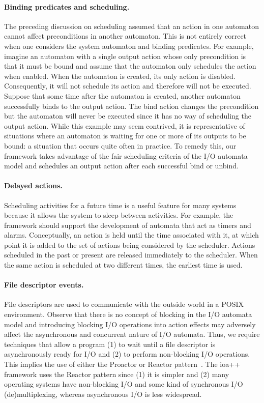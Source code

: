 \paragraph*{Binding predicates and scheduling.}
The preceding discussion on scheduling assumed that an action in one automaton cannot affect preconditions in another automaton.
This is not entirely correct when one considers the system automaton and binding predicates.
For example, imagine an automaton with a single output action whose only precondition is that it must be bound and assume that the automaton only schedules the action when enabled.
When the automaton is created, its only action is disabled.
Consequently, it will not schedule its action and therefore will not be executed.
Suppose that some time after the automaton is created, another automaton successfully binds to the output action.
The bind action changes the precondition but the automaton will never be executed since it has no way of scheduling the output action.
While this example may seem contrived, it is representative of situations where an automaton is waiting for one or more of its outputs to be bound: a situation that occurs quite often in practice.
To remedy this, our framework takes advantage of the fair scheduling criteria of the I/O automata model and schedules an output action after each successful bind or unbind.

\paragraph*{Delayed actions.}
Scheduling activities for a future time is a useful feature for many systems because it allows the system to sleep between activities. For example, the framework should support the development of automata that act as timers and alarms.
Conceptually, an action is held until the time associated with it, at which point it is added to the set of actions being considered by the scheduler.
Actions scheduled in the past or present are released immediately to the scheduler.
When the same action is scheduled at two different times, the earliest time is used.

\paragraph*{File descriptor events.}
File descriptors are used to communicate with the outside world in a POSIX environment.
Observe that there is no concept of blocking in the I/O automata model and introducing blocking I/O operations into action effects may adversely affect the asynchronous and concurrent nature of I/O automata.
Thus, we require techniques that allow a program (1) to wait until a file descriptor is asynchronously ready for I/O and (2) to perform non-blocking I/O operations.
This implies the use of either the Proactor or Reactor pattern~\cite{schmidt2000pattern}.
The ioa++ framework uses the Reactor pattern since (1) it is simpler and (2) many operating systems have non-blocking I/O and some kind of synchronous I/O (de)multiplexing, whereas asynchronous I/O is less widespread.

